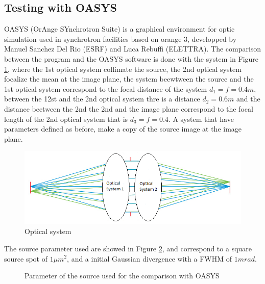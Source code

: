 \subsection{Testing with OASYS}
%
OASYS (OrAnge SYnchrotron Suite) is a graphical environment for optic simulation used in synchrotron facilities based on orange 3, developped by Manuel Sanchez Del Rio (ESRF) and Luca Rebuffi (ELETTRA).
The comparison between the program and the OASYS software is done with the system in Figure \ref{fig: Optical system}, where the 1st optical system collimate the source, the 2nd optical system focalize the mean at the image plane, the system beewtween the source and the 1st optical system correspond to the focal distance of the system $d_1 = f = 0.4 m $, between the 12st and the 2nd optical system thre is a distance $d_2 = 0.6 m $ and the distance beetween the 2nd the 2nd and the image plane correspond to the focal length of the 2nd optical system that is $d_3 = f = 0.4$. A system that have parameters defined as before, make a copy of the source image at the image plane.
%
\begin{figure}[]
%
\centering
%
\includegraphics[width=.6\textwidth]{Immagini/Chapter4/OpticalSystems}
%
\caption{Optical system}
%
\label{fig: Optical system}
%
\end{figure}
%
The source parameter used are showed in Figure \ref{fig: Source Parameter for OASYS}, and correspond to  a square source spot of $1 \mu m^2 $, and a initial Gaussian divergence with a FWHM of $1 mrad $.
\begin{figure}[]
%
\centering
%
%
%
\caption{Parameter of the source used for the comparison with OASYS}
%
\label{fig: Source Parameter for OASYS}
%
\end{figure}
